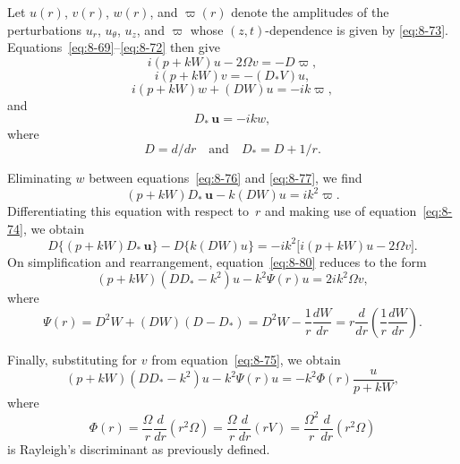 Let $u(r)$, $v(r)$, $w(r)$, and $\varpi(r)$ denote the amplitudes of the perturbations $u_r$, $u_\theta$, $u_z$, and $\varpi$ whose $(z,t)$-dependence is given by \eqref{eq:8-73}. Equations~\eqref{eq:8-69}--\eqref{eq:8-72} then give
\begin{equation}
\label{eq:8-74}
i(p+kW)u - 2\Omega v = -D\varpi,
\end{equation}
\begin{equation}
\label{eq:8-75}
i(p+kW)v = -(D_*V)u,
\end{equation}
\begin{equation}
\label{eq:8-76}
i(p+kW)w + (DW)u = -ik\varpi,
\end{equation}
and
\begin{equation}
\label{eq:8-77}
D_*\,\mathbf{u} = -ikw,
\end{equation}
where
\begin{equation}
\label{eq:8-78}
D = d/dr \quad \text{and} \quad D_* = D + 1/r.
\end{equation}

Eliminating $w$ between equations~\eqref{eq:8-76} and \eqref{eq:8-77}, we find
\begin{equation}
\label{eq:8-79}
(p+kW)D_*\,\mathbf{u} - k(DW)u = ik^2\varpi.
\end{equation}
Differentiating this equation with respect to~$r$ and making use of equation~\eqref{eq:8-74}, we obtain
\begin{equation}
\label{eq:8-80}
D\bigl\{(p+kW)D_*\,\mathbf{u}\bigr\} - D\bigl\{k(DW)u\bigr\} = -ik^2\bigl[i(p+kW)u - 2\Omega v\bigr].
\end{equation}
On simplification and rearrangement, equation~\eqref{eq:8-80} reduces to the form
\begin{equation}
\label{eq:8-81}
(p+kW)(DD_*-k^2)u - k^2\Psi(r)u = 2ik^2\Omega v,
\end{equation}
where
\begin{equation}
\label{eq:8-82}
\Psi(r) = D^2W + (DW)(D-D_*) = D^2 W - \frac{1}{r}\frac{dW}{dr} = r\frac{d}{dr}\!\left(\frac{1}{r}\frac{dW}{dr}\right).
\end{equation}

Finally, substituting for $v$ from equation~\eqref{eq:8-75}, we obtain
\begin{equation}
\label{eq:8-83}
(p+kW)(DD_*-k^2)u - k^2\Psi(r)u = -k^2\Phi(r)\frac{u}{p+kW},
\end{equation}
where
\begin{equation}
\label{eq:8-84}
\Phi(r) = \frac{\Omega}{r}\frac{d}{dr}(r^2\Omega) = \frac{\Omega}{r}\frac{d}{dr}(rV) = \frac{\Omega^2}{r}\frac{d}{dr}(r^2\Omega)
\end{equation}
is Rayleigh's discriminant as previously defined.

